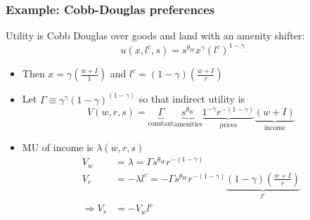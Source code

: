 \documentclass[10pt,notes=hide]{beamer}
\begin{document}
\begin{frame}
\frametitle{Example: Cobb-Douglas preferences}
Utility is Cobb Douglas over goods and land with an amenity shifter: 
$$u(x, l^c, s)=s^{\theta_W} x^{\gamma} (l^c)^{1-\gamma}$$ 
\begin{itemize}
\item Then $x=\gamma \left(\frac{w + I}{1} \right)$ and $l^c=(1-\gamma)\left(\frac{w + I}{r}\right)$ \medskip
\item Let $\Gamma \equiv \gamma^\gamma (1-\gamma)^{(1-\gamma)}$ so that indirect utility is
\begin{equation*}
V(w, r, s)  = 
\underbrace{\Gamma}_{\text{constant}} 
\underbrace{s^{\theta_W}}_{\text{amenities}} 
\underbrace{1^{-\gamma} r^{-(1-\gamma)}}_{\text{prices}}
\underbrace{(w + I)}_{\text{income}}
\end{equation*}
\item MU of income is $\lambda(w, r, s)$ 
\begin{align*}
V_w &= \lambda = \Gamma s^{\theta_W} r^{-(1-\gamma)}  \\
V_r &= -\lambda l^c =  -\Gamma s^{\theta_W} r^{-(1-\gamma)} \underbrace{(1-\gamma)\left(\frac{w + I}{r}\right)}_{l^c}  \\
\Rightarrow  V_r &= - V_w l^c 
\end{align*}
\end{itemize}
\end{frame}
\end{document}
